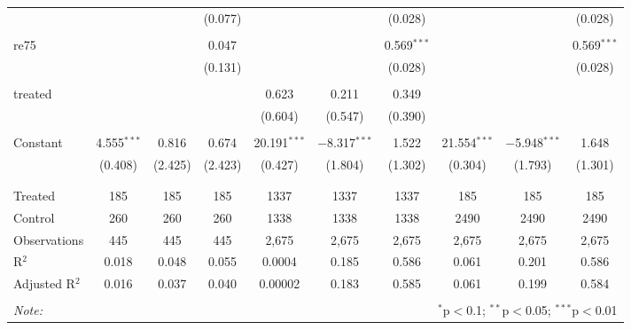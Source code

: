 \begin{table}[!htbp]
\begin{tabular}{@{\extracolsep{5pt}}lccccccccc}
  &  &  & (0.077) &  &  & (0.028) &  &  & (0.028) \\ 
  & & & & & & & & & \\ 
 re75 &  &  & 0.047 &  &  & 0.569$^{***}$ &  &  & 0.569$^{***}$ \\ 
  &  &  & (0.131) &  &  & (0.028) &  &  & (0.028) \\ 
  & & & & & & & & & \\ 
 treated &  &  &  & 0.623 & 0.211 & 0.349 &  &  &  \\ 
  &  &  &  & (0.604) & (0.547) & (0.390) &  &  &  \\ 
  & & & & & & & & & \\ 
 Constant & 4.555$^{***}$ & 0.816 & 0.674 & 20.191$^{***}$ & $-$8.317$^{***}$ & 1.522 & 21.554$^{***}$ & $-$5.948$^{***}$ & 1.648 \\ 
  & (0.408) & (2.425) & (2.423) & (0.427) & (1.804) & (1.302) & (0.304) & (1.793) & (1.301) \\ 
  & & & & & & & & & \\ 
\hline \\[-1.8ex] 
Treated & 185 & 185 & 185 & 1337 & 1337 & 1337 & 185 & 185 & 185 \\ 
Control & 260 & 260 & 260 & 1338 & 1338 & 1338 & 2490 & 2490 & 2490 \\ 
Observations & 445 & 445 & 445 & 2,675 & 2,675 & 2,675 & 2,675 & 2,675 & 2,675 \\ 
R$^{2}$ & 0.018 & 0.048 & 0.055 & 0.0004 & 0.185 & 0.586 & 0.061 & 0.201 & 0.586 \\ 
Adjusted R$^{2}$ & 0.016 & 0.037 & 0.040 & 0.00002 & 0.183 & 0.585 & 0.061 & 0.199 & 0.584 \\ 
\hline 
\hline \\[-1.8ex] 
\textit{Note:}  & \multicolumn{9}{r}{$^{*}$p$<$0.1; $^{**}$p$<$0.05; $^{***}$p$<$0.01} \\ 
\end{tabular} 
\end{table} 
